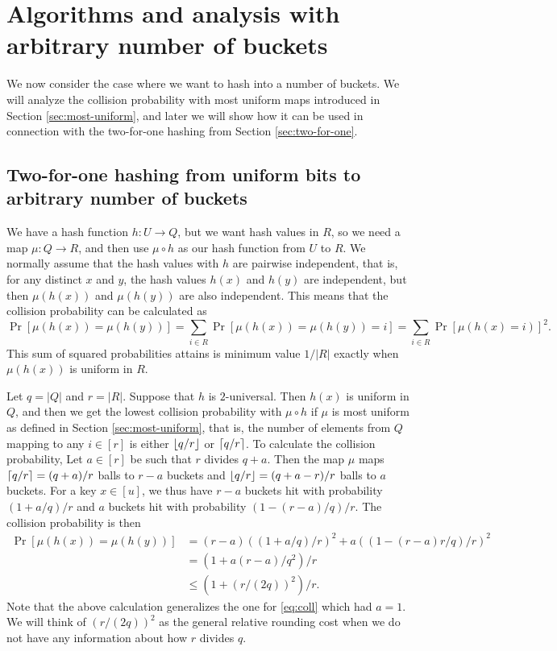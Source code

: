 
\section{Algorithms and analysis with arbitrary number of buckets}\label{sec:arbitrary-buckets}
We now consider the case where we want to hash into
a number of buckets. We will analyze the collision probability
with most uniform maps introduced in Section \ref{sec:most-uniform},
and later we will show how it can be used in connection with the
two-for-one hashing from Section \ref{sec:two-for-one}.

\subsection{Two-for-one hashing from uniform bits to arbitrary number of buckets}
We have a hash function $h:U\to Q$, but we want hash values in $R$, so
we need a map $\mu:Q\to R$, and then use $\mu\circ h$ as
our hash function from $U$ to $R$. We normally assume that the hash values 
with $h$ are pairwise independent, that is, for any distinct $x$ and $y$,
the hash values $h(x)$ and $h(y)$ are independent, but then 
$\mu(h(x))$ and $\mu(h(y))$ are also independent. This means
that the collision probability can be calculated
as 
\[\Pr[\mu(h(x))=\mu(h(y))]=\sum_{i\in R}\Pr[\mu(h(x))=\mu(h(y))=i]=\sum_{i\in R}\Pr[\mu(h(x)=i)]^2.\]
This sum of squared probabilities attains is minimum value $1/|R|$
exactly when $\mu(h(x))$ is uniform in $R$. 

Let $q=|Q|$ and $r=|R|$. Suppose that $h$ is $2$-universal. Then
$h(x)$ is uniform in $Q$, and then we get the lowest collision
probability with $\mu\circ h$ if $\mu$ is most uniform as defined in
Section \ref{sec:most-uniform}, that is, the number of elements from
$Q$ mapping to any $i\in[r]$ is either $\lfloor {q/r} \rfloor$ or
$\lceil {q/r}\rceil$. To calculate the collision probability,
Let $a\in[r]$ be such that $r$ divides $q+a$. Then the map $\mu$ maps
$\lceil {q/r}\rceil=(q+a)/r$ balls to $r-a$ buckets and
$\lfloor {q/r} \rfloor=(q+a-r)/r$ balls to $a$ buckets. For a key $x\in [u]$, we
thus have $r-a$ buckets hit with probability $(1+a/q)/r$ and
$a$ buckets hit with probability $(1-(r-a)/q)/r$.
The collision probability is then
\begin{equation}\begin{split}
   \Pr[\mu(h(x))=\mu(h(y))]
                  &= (r-a)((1+a/q)/r)^2+a((1-(r-a)r/q)/r)^2
                 \\&=(1+a(r-a)/q^2)/r
                 \\&\le \left(1+(r/(2q))^2\right)/r.\label{eq:coll-a}
\end{split}\end{equation}
Note that the above calculation generalizes the one for \eqref{eq:coll} which
had $a=1$. We will think of $(r/(2q))^2$ as the general relative rounding
cost when we do not have any information about how $r$ divides $q$.

